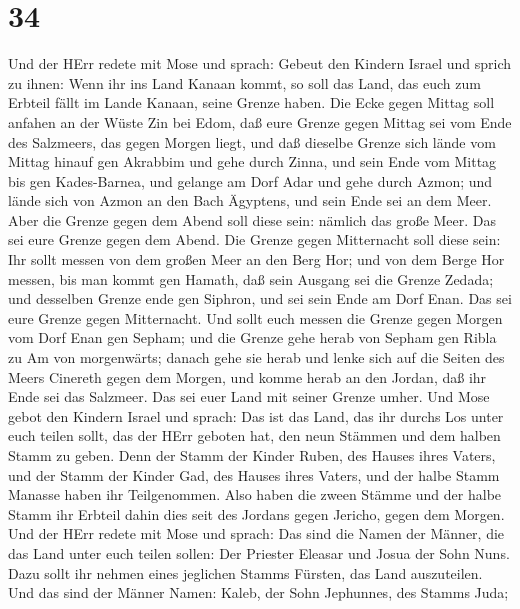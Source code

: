 \hypertarget{section-33}{%
\section{34}\label{section-33}}

 Und der HErr redete mit Mose und sprach: 
Gebeut den Kindern Israel und sprich zu ihnen: Wenn ihr ins Land Kanaan
kommt, so soll das Land, das euch zum Erbteil fällt im Lande Kanaan,
seine Grenze haben.  Die Ecke gegen Mittag soll anfahen an
der Wüste Zin bei Edom, daß eure Grenze gegen Mittag sei vom Ende des
Salzmeers, das gegen Morgen liegt,  und daß dieselbe Grenze
sich lände vom Mittag hinauf gen Akrabbim und gehe durch Zinna, und sein
Ende vom Mittag bis gen Kades-Barnea, und gelange am Dorf Adar und gehe
durch Azmon;  und lände sich von Azmon an den Bach Ägyptens,
und sein Ende sei an dem Meer.  Aber die Grenze gegen dem
Abend soll diese sein: nämlich das große Meer. Das sei eure Grenze gegen
dem Abend.  Die Grenze gegen Mitternacht soll diese sein:
Ihr sollt messen von dem großen Meer an den Berg Hor;  und
von dem Berge Hor messen, bis man kommt gen Hamath, daß sein Ausgang sei
die Grenze Zedada;  und desselben Grenze ende gen Siphron,
und sei sein Ende am Dorf Enan. Das sei eure Grenze gegen Mitternacht.
 Und sollt euch messen die Grenze gegen Morgen vom Dorf
Enan gen Sepham;  und die Grenze gehe herab von Sepham gen
Ribla zu Am von morgenwärts; danach gehe sie herab und lenke sich auf
die Seiten des Meers Cinereth gegen dem Morgen,  und komme
herab an den Jordan, daß ihr Ende sei das Salzmeer. Das sei euer Land
mit seiner Grenze umher.  Und Mose gebot den Kindern Israel
und sprach: Das ist das Land, das ihr durchs Los unter euch teilen
sollt, das der HErr geboten hat, den neun Stämmen und dem halben Stamm
zu geben.  Denn der Stamm der Kinder Ruben, des Hauses
ihres Vaters, und der Stamm der Kinder Gad, des Hauses ihres Vaters, und
der halbe Stamm Manasse haben ihr Teilgenommen.  Also haben
die zween Stämme und der halbe Stamm ihr Erbteil dahin dies seit des
Jordans gegen Jericho, gegen dem Morgen.  Und der HErr
redete mit Mose und sprach:  Das sind die Namen der Männer,
die das Land unter euch teilen sollen: Der Priester Eleasar und Josua
der Sohn Nuns.  Dazu sollt ihr nehmen eines jeglichen
Stamms Fürsten, das Land auszuteilen.  Und das sind der
Männer Namen: Kaleb, der Sohn Jephunnes, des Stamms Juda; 
